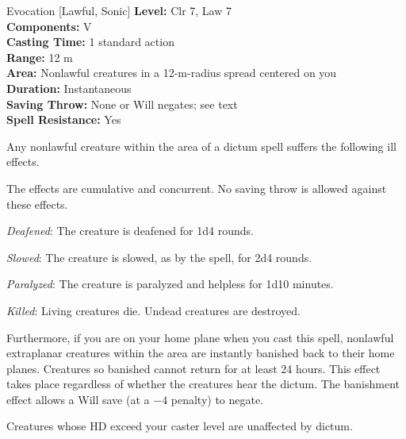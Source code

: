 {Evocation [Lawful, Sonic]}
{
	\textbf{Level:}
	Clr 7, Law 7\\
	\textbf{Components:}
	V\\
	\textbf{Casting Time:}
	1 standard action\\
	\textbf{Range:}
	12 m\\
	\textbf{Area:}
	Nonlawful creatures in a 12-m-radius spread centered on you\\
	\textbf{Duration:}
	Instantaneous\\
	\textbf{Saving Throw:}
	None or Will negates; see text\\
	\textbf{Spell Resistance:}
	Yes\\
}
{
	Any nonlawful creature within the area of a dictum spell suffers the following ill effects.

	The effects are cumulative and concurrent. No saving throw is allowed against these effects.

	\textit{Deafened}:
	The creature is deafened for 1d4 rounds.

	\textit{Slowed}:
	The creature is slowed, as by the  spell, for 2d4 rounds.

	\textit{Paralyzed}:
	The creature is paralyzed and helpless for 1d10 minutes.

	\textit{Killed}:
	Living creatures die. Undead creatures are destroyed.

	Furthermore, if you are on your home plane when you cast this spell, nonlawful extraplanar creatures within the area are instantly banished back to their home planes. Creatures so banished cannot return for at least 24 hours. This effect takes place regardless of whether the creatures hear the dictum. The banishment effect allows a Will save (at a $-4$ penalty) to negate.

	Creatures whose HD exceed your caster level are unaffected by dictum.

}
